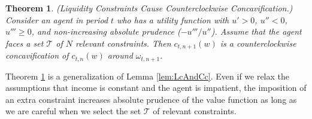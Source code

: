 \documentclass[titlepage]{\econtex}
\providecommand{\wAlt}{\omega}
\newtheorem{theorem}{Theorem}
\begin{document}
  \begin{theorem}\label{thm:lcip2} (Liquidity Constraints Cause Counterclockwise Concavification.) \\
    Consider an agent in period $t$ who has a utility function with $u' > 0$, $u'' < 0$, $u''' \geq 0$, and non-increasing absolute prudence ($-u'''/u''$). Assume that the agent faces a set $\mathcal{T}$ of $N$ relevant constraints.  Then $c_{t,n+1}(w)$ is a counterclockwise concavification of $c_{t,n}(w)$ around $\wAlt_{t,n+1}$.
  \end{theorem}




  \noindent Theorem \ref{thm:lcip2} is a generalization of Lemma \ref{lem:LcAndCc}. Even if we relax the assumptions that income is constant and the agent is impatient, the imposition of an extra constraint increases absolute prudence of the value function as long as we are careful when we select the set $\mathcal{T}$ of relevant constraints.
\end{document}
